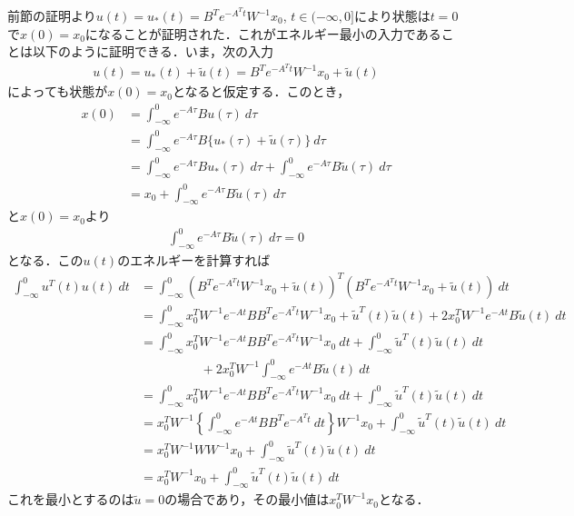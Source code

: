 前節の証明より$u(t)=u_*(t) = B^T e^{-A^T t} W^{-1} x_0$, $t\in(-\infty,0]$により状態は$t=0$で$x(0)=x_0$になることが証明された．これがエネルギー最小の入力であることは以下のように証明できる．いま，次の入力
\begin{align}
	u(t)=u_*(t)+ \tilde{u}(t) = B^T e^{-A^T t} W^{-1} x_0 + \tilde{u}(t)
\end{align}
によっても状態が$x(0)=x_0$となると仮定する．このとき，
\begin{align}
	x(0) 
	&= \int_{-\infty}^{0} e^{-A\tau}B u(\tau) \ d \tau
\nonumber \\
	&= \int_{-\infty}^{0} e^{-A\tau}B \{u_*(\tau) + \tilde{u}(\tau) \} \ d \tau
\nonumber \\
	&= \int_{-\infty}^{0} e^{-A\tau}B u_*(\tau)  \ d \tau
	   + \int_{-\infty}^{0} e^{-A\tau}B \tilde{u}(\tau) \ d \tau
\nonumber \\
	&= x_0+ \int_{-\infty}^{0} e^{-A\tau}B \tilde{u}(\tau) \ d \tau
\end{align}
と$x(0)=x_0$より
\begin{align}
	\int_{-\infty}^{0} e^{-A\tau}B \tilde{u}(\tau) \ d \tau = 0
\end{align}
となる．この$u(t)$のエネルギーを計算すれば
\begin{align}
	\int_{-\infty}^{0} u^T(t) u(t) \ dt
	&= \int_{-\infty}^{0} 
		(B^T e^{-A^T t} W^{-1} x_0 + \tilde{u}(t))^T 
		(B^T e^{-A^T t} W^{-1} x_0 + \tilde{u}(t)) \ dt
\nonumber \\
	&= \int_{-\infty}^{0} 
		x_0^T W^{-1} e^{-A t} B B^T e^{-A^T t} W^{-1} x_0
		+ \tilde{u}^T(t) \tilde{u}(t) 
		+ 2 x_0^T W^{-1} e^{-A t} B \tilde{u}(t) \ dt
\nonumber \\
	&= \int_{-\infty}^{0} 
		x_0^T W^{-1} e^{-A t} B B^T e^{-A^T t} W^{-1} x_0 \ dt
		+ \int_{-\infty}^{0} \tilde{u}^T(t) \tilde{u}(t) \ dt
\nonumber \\ & \hspace{2cm}
		+ 2 x_0^T W^{-1} \int_{-\infty}^{0} e^{-A t} B \tilde{u}(t) \ dt
\nonumber \\
	&= \int_{-\infty}^{0} 
		x_0^T W^{-1} e^{-A t} B B^T e^{-A^T t} W^{-1} x_0 \ dt
		+ \int_{-\infty}^{0} \tilde{u}^T(t) \tilde{u}(t) \ dt
\nonumber \\
	&= x_0^T W^{-1} \left \{ \int_{-\infty}^{0} 
		 e^{-A t} B B^T e^{-A^T t} \ dt \right \} W^{-1} x_0 
		+ \int_{-\infty}^{0} \tilde{u}^T(t) \tilde{u}(t) \ dt
\nonumber \\
	&= x_0^T W^{-1} W W^{-1} x_0 
		+ \int_{-\infty}^{0} \tilde{u}^T(t) \tilde{u}(t) \ dt
\nonumber \\
	&= x_0^T W^{-1} x_0 
	   + \int_{-\infty}^{0} \tilde{u}^T(t) \tilde{u}(t) \ dt
\end{align}
これを最小とするのは$\tilde{u}=0$の場合であり，その最小値は$x_0^T W^{-1} x_0$となる．




